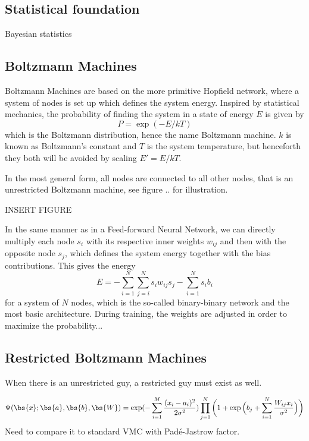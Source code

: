 \subsection{Statistical foundation}
Bayesian statistics

\subsection{Boltzmann Machines}
Boltzmann Machines are based on the more primitive Hopfield network, where a system of nodes is set up which defines the system energy. Inspired by statistical mechanics, the probability of finding the system in a state of energy $E$ is given by
\begin{equation}
P=\exp(-E/kT)
\end{equation}
which is the Boltzmann distribution, hence the name Boltzmann machine. $k$ is known as Boltzmann's constant and $T$ is the system temperature, but henceforth they both will be avoided by scaling $E'=E/kT$. 

In the most general form, all nodes are connected to all other nodes, that is an unrestricted Boltzmann machine, see figure .. for illustration. 

INSERT FIGURE

In the same manner as in a Feed-forward Neural Network, we can directly multiply each node $s_i$ with its respective inner weights $w_{ij}$ and then with the opposite node $s_j$, which defines the system energy together with the bias contributions. This gives the energy
\begin{equation}
E=-\sum_{i=1}^N\sum_{j=i}^N s_iw_{ij}s_j - \sum_{i=1}^Ns_ib_i
\end{equation}
for a system of $N$ nodes, which is the so-called binary-binary network and the most basic architecture. During training, the weights are adjusted in order to maximize the probability...

\subsection{Restricted Boltzmann Machines}
When there is an unrestricted guy, a restricted guy must exist as well. 

\begin{equation}
\Psi(\bs{x};\bs{a},\bs{b},\bs{W})=\exp(-\sum_{i=1}^M\frac{(x_i-a_i)^2}{2\sigma^2})\prod_{j=1}^N\bigg(1+\exp\Big(b_j+\sum_{i=1}^N\frac{W_{ij}x_i}{\sigma^2}\Big)\bigg)
\label{eq:NQSWF}
\end{equation}
Need to compare it to standard VMC with Padé-Jastrow factor. 